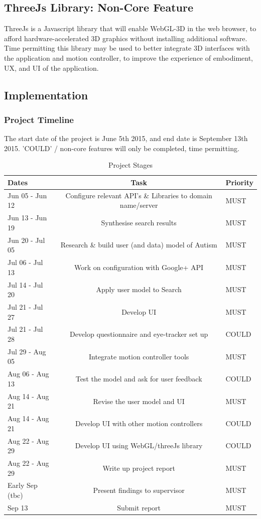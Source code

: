 \documentclass[a4paper, 10pt]{article}
\begin{document}
\subsection{ThreeJs Library: Non-Core Feature}
ThreeJs is a Javascript library that will enable WebGL-3D in the web browser, to afford hardware-accelerated 3D graphics without installing additional software. Time permitting this library may be used to better integrate 3D interfaces with the application and motion controller, to improve the experience of embodiment, UX, and UI of the application.

\subsection{Implementation}\label{plan}

\subsubsection{Project Timeline}
The start date of the project is June 5th 2015, and end date is September 13th 2015. 'COULD' / non-core features will only be completed, time permitting.
\begin{table}[H]
\caption{Project Stages} 
\centering
\begin{tabular}{ | L |c| L |}
\hline\hline 
Dates & Task & Priority\\ [0.5ex]
\hline 
Jun 05 - Jun 12 & Configure relevant API's \& Libraries to domain name/server & MUST\\
\hline 
Jun 13 - Jun 19 & Synthesise search results & MUST\\
\hline 
Jun 20 - Jul 05 & Research \& build user (and data) model of Autism & MUST\\
\hline 
Jul 06 - Jul 13 & Work on configuration with Google+ API & MUST\\
\hline 
Jul 14 - Jul 20 & Apply user model to Search& MUST\\ 
\hline 
Jul 21 - Jul 27 & Develop UI & MUST\\
\hline 
Jul 21 - Jul 28 & Develop questionnaire and eye-tracker set up & COULD\\
\hline 
Jul 29 - Aug 05 & Integrate motion controller tools& MUST\\
\hline 
Aug 06 - Aug 13 & Test the model and ask for user feedback & COULD\\
\hline 
Aug 14 - Aug 21 & Revise the user model and UI & MUST\\
\hline 
Aug 14 - Aug 21 & Develop UI with other motion controllers & COULD\\
\hline 
Aug 22 - Aug 29 & Develop UI using WebGL/threeJs library & COULD\\
\hline 
Aug 22 - Aug 29 & Write up project report & MUST\\ 
\hline 
Early Sep (tbc) & Present findings to supervisor & MUST\\
\hline 
Sep 13 & Submit report & MUST\\[0.5ex]
\hline
\end{tabular}
\label{stages} 
\end{table}
\end{document}
